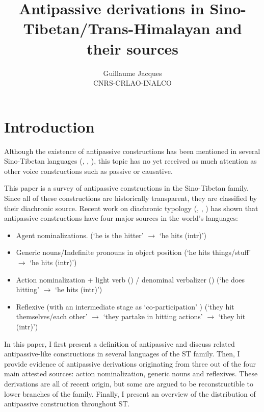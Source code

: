 \documentclass[oneside,a4paper,11pt]{article}
\begin{document}
 
\title{Antipassive derivations in Sino-Tibetan/Trans-Himalayan and their sources}
\author{Guillaume Jacques\\ CNRS-CRLAO-INALCO}
\maketitle

\section*{Introduction}
Although the existence of antipassive constructions has been mentioned in several Sino-Tibetan languages (\citealt[225-7]{doornenbal09}, \citealt{jacques14antipassive}, \citealt{bickel15antipassive}), this topic has no yet received as much attention as other voice constructions such as passive or causative.

This paper is a survey of antipassive constructions in the Sino-Tibetan family. Since all of these constructions are historically transparent, they are classified by their diachronic source. Recent work on diachronic typology (\citealt[235]{janic.these},  \citealt{jacques14antipassive}, \citealt{sanso17antipassive}) has shown that antipassive constructions have four major sources in the world's languages:
\begin{itemize}
\item Agent nominalizations. (`he is the hitter' $\rightarrow$  `he hits (intr)')
\item Generic nouns/Indefinite pronouns in object position  (`he hits things/stuff' $\rightarrow$  `he hits (intr)')
\item Action nominalization + light verb (\citealt{creissels12antip}) / denominal verbalizer (\citealt{jacques14antipassive}) (`he does hitting' $\rightarrow$  `he hits (intr)')
\item Reflexive (with an intermediate stage as `co-participation' \citet{creissels08coparticipation}) (`they hit themselves/each other' $\rightarrow$  `they partake in hitting actions' $\rightarrow$  `they hit (intr)')
\end{itemize}

In this paper, I first present a definition of antipassive and discuss related antipassive-like constructions in several languages of the ST family. Then, I provide evidence of antipassive derivations originating from three out of the four main attested sources: action nominalization, generic nouns and reflexives. These derivations are all of recent origin, but some are argued to be reconstructible to lower branches of the family. Finally, I present an overview of the distribution of antipassive construction throughout ST.
\end{document}
